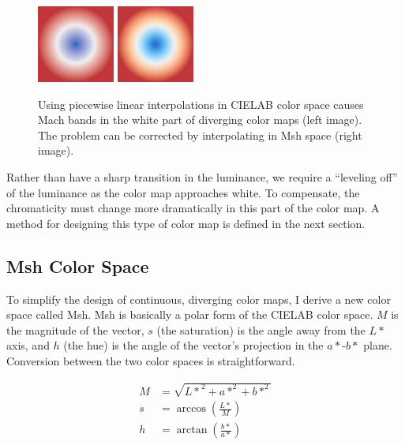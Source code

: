 \documentclass{vgtc}                          %
\newcommand{\Lab}{CIELAB\xspace}
\newcommand{\Msh}{Msh\xspace}
\begin{document}
\begin{figure}
  \centering
  \includegraphics[width=1in]{images/Cool2WarmLabRadial}
  \qquad
  \includegraphics[width=1in]{images/Cool2WarmRadial}
  \caption{Using piecewise linear interpolations in \Lab color space causes
    Mach bands in the white part of diverging color maps (left image).  The
    problem can be corrected by interpolating in \Msh space (right image).}
  \label{fig:LinearMachBands}
\end{figure}

Rather than have a sharp transition in the luminance, we require a
``leveling off'' of the luminance as the color map approaches white.  To
compensate, the chromaticity must change more dramatically in this part of
the color map.  A method for designing this type of color map is defined in
the next section.

\subsection{\Msh Color Space}
\label{sec:MshColorSpace}

To simplify the design of continuous, diverging color maps, I derive a new
color space called \Msh.  \Msh is basically a polar form of the \Lab color
space.  $M$ is the magnitude of the vector, $s$ (the saturation) is the
angle away from the $L*$ axis, and $h$ (the hue) is the angle of the
vector's projection in the $a*$-$b*$ plane.  Conversion between the two
color spaces is straightforward.

\begin{equation}
  \begin{split}
    M &= \sqrt{{L*}^2 + a*^2 + b*^2} \\
    s &= \arccos\left(\frac{L*}{M}\right) \\
    h &= \arctan\left(\frac{b*}{a*}\right)
  \end{split}
  \label{eqn:LabToMsh}
\end{equation}
\end{document}
